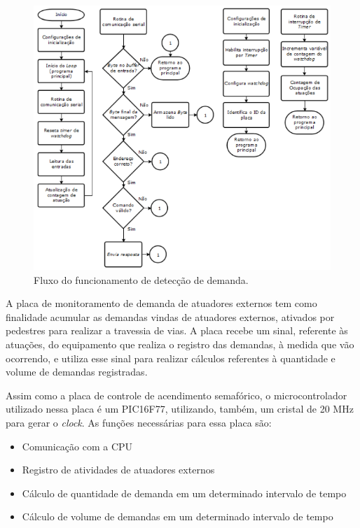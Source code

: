\begin{figure}[ht]
    \begin{center}
    \includegraphics{figuras/fluxo_atdr.PNG}
    \end{center}
    \caption[Fluxograma do atuador]{Fluxo do funcionamento de detecção de demanda.}
    \label{fluxo_atdr}
\end{figure}

A placa de monitoramento de demanda de atuadores externos tem como finalidade acumular as demandas vindas de atuadores externos, ativados por pedestres para realizar a travessia de vias. A placa recebe um sinal, referente às atuações, do equipamento que realiza o registro das demandas, à medida que vão ocorrendo, e utiliza esse sinal para realizar cálculos referentes à quantidade e volume de demandas registradas.

Assim como a placa de controle de acendimento semafórico, o microcontrolador utilizado nessa placa é um PIC16F77, utilizando, também, um cristal de 20 MHz para gerar o \textit{clock}. As funções necessárias para essa placa são:

\begin{itemize}
\item Comunicação com a \ac{CPU}
\item Registro de atividades de atuadores externos
\item Cálculo de quantidade de demanda em um determinado intervalo de tempo
\item Cálculo de volume de demandas em um determinado intervalo de tempo
\end{itemize}

